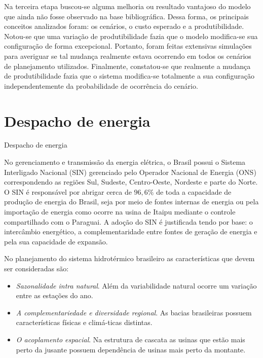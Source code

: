 \documentclass[12pt]{beamer}%
\begin{document}
\begin{frame}
	\begin{justify}	
	Na terceira etapa buscou-se alguma melhoria ou resultado vantajoso do modelo que ainda n\~ao fosse  observado na base
	bibliogr\'afica. Dessa forma, os principais conceitos analizados foram: os cen\'arios, o custo esperado e a
	produtibilidade. Notou-se que uma varia\c c\~ao de produtibilidade fazia que o modelo modifica-se sua configura\c c\~ao
	de forma excepcional. Portanto, foram feitas extensivas simula\c c\~oes para averiguar se tal mudan\c ca realmente
	estava ocorrendo em todos os cen\'arios de planejamento  utilizados. Finalmente, constatou-se que realmente a mudan\c ca
	de produtibilidade fazia que o sistema modifica-se totalmente a sua configura\c c\~ao independentemente da probabilidade
	de ocorr\^encia do cen\'ario.
	\end{justify}
\end{frame}

\section{Despacho de energia}
\begin{frame}{Despacho de energia}
	\begin{justify}	
	No gerenciamento e transmiss\~ao da energia el\'etrica, o Brasil possui o Sistema Interligado Nacional
	(SIN) gerenciado pelo Operador Nacional de Energia (ONS) correspondendo as regi\~oes Sul, Sudeste,
	Centro-Oeste, Nordeste e parte do Norte. O SIN \'e respons\'avel por abrigar cerca de
	$96,6\%$ de toda a capacidade de produ\c c\~ao de energia do Brasil, seja por meio de fontes internas de energia
	ou pela importa\c c\~ao de energia como ocorre na usina de Itaipu mediante o controle compartilhado com o
	Paraguai. A ado\c c\~ao do SIN \'e justificada tendo por base: o interc\^ambio energ\'etico, a
	complementaridade entre fontes de gera\c c\~ao de energia e pela sua capacidade de expans\~ao.
	\end{justify}
\end{frame}

\begin{frame}
	\begin{justify}	
		No planejamento do sistema hidrot\'ermico brasileiro as caracter\'isticas que devem ser consideradas s\~ao:
		\begin{itemize}
		\justifying
		\item \textit{Sazonalidade intra natural}. Al\'em da variabilidade natural ocorre um varia\c c\~ao entre as esta\c c\~oes do ano. 
		\item \textit{A complementariedade e diversidade regional}. As bacias brasileiras possuem caracter\'isticas
			f\'isicas e clim\'a-ticas distintas. 
		\item \textit{O acoplamento espacial}. Na estrutura de cascata as usinas que est\~ao mais perto da jusante possuem depend\^encia
			de usinas mais perto da montante.
		\end{itemize}
	\end{justify}
\end{frame}
\end{document}
